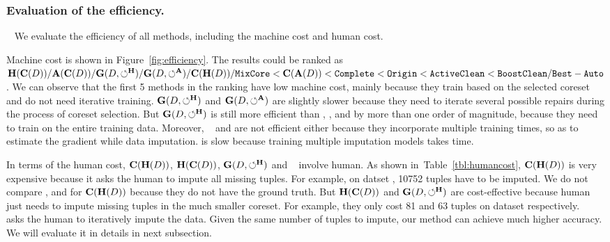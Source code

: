  



\subsubsection{Evaluation of the efficiency.}~\label{sec:exp:efficiency} We  evaluate the efficiency of all methods, including the machine cost and human cost.

 Machine cost is shown  in Figure~\ref{fig:efficiency}.  The results could be ranked as $\mathbf{H}(\mathbf{C}(D))/\mathbf{A}(\mathbf{C}(D))/\mathbf{G}(D,\circlearrowleft^\mathbf{H})/\mathbf{G}(D,\circlearrowleft^\mathbf{A})/\mathbf{C}(\mathbf{H}(D))/{\tt MixCore} < \mathbf{C}(\mathbf{A}(D)) < {\tt Complete} < {\tt Origin} < {\tt ActiveClean} < {\tt BoostClean} /{\tt Best-Auto} $. We can observe that the first 5 methods in the ranking have low machine cost, mainly because they train based on the selected coreset and do not need iterative training. $\mathbf{G}(D,\circlearrowleft^\mathbf{H})$ and  $\mathbf{G}(D,\circlearrowleft^\mathbf{A})$ are slightly slower  because they need to iterate several possible repairs during the process of coreset selection.  But $\mathbf{G}(D,\circlearrowleft^\mathbf{H})$ is still more efficient than \noclean, \truth, \boostclean and \gain by more than one order of magnitude,  because they need to train on the entire training data. 
 Moreover, \actclean~  and \boostclean are  not efficient either because they incorporate multiple training times, so as to estimate the gradient while data imputation. \gain is slow because training multiple imputation models takes time.


 In terms of the human cost, $\mathbf{C}(\mathbf{H}(D))$, $\mathbf{H}(\mathbf{C}(D))$, $\mathbf{G}(D,\circlearrowleft^\mathbf{H})$ and  \actclean~ involve human. As shown in~Table~\ref{tbl:humancost}, $\mathbf{C}(\mathbf{H}(D))$ is very expensive because it asks the human to impute all missing tuples. For example, on datset \adult, 10752 tuples have to be imputed. We do not compare \credit, \bike and \air for $\mathbf{C}(\mathbf{H}(D))$ because they do not have the ground truth.
 But $\mathbf{H}(\mathbf{C}(D))$ and $\mathbf{G}(D,\circlearrowleft^\mathbf{H})$ are cost-effective because human just needs to impute missing tuples in the much smaller coreset. For example, they only cost 81 and 63 tuples on dataset \adult respectively. 
\actclean~ asks the human to iteratively impute the data. Given the same number of tuples to impute, our method can achieve much higher accuracy. We will  evaluate it in details in next subsection.
 



